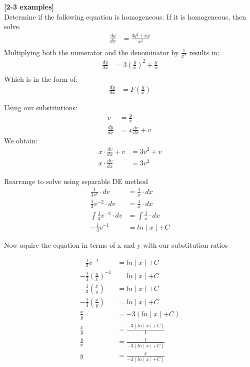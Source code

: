 \documentclass{article}
\begin{document}
\begin{flushleft}
{\textbf{[2-3 examples]}\\
Determine if the following equation is homogeneous. If it is homogeneous, then solve.
\begin{align*}
\frac{dy}{dx} & = \frac{3y^2 +xy}{x^2}\\
\end{align*}
Multiplying both the numerator and the denominator by $\frac{1}{x^2}$ results in:\\
\begin{align*}
\frac{dy}{dx} & = 3(\frac{y}{x})^2+\frac{y}{x}\\
\end{align*}
Which is in the form of:
\begin{align*}
\frac{dy}{dx} & = F (\frac{y}{x})
\end{align*}

Using our substitutions:\\
\begin{align*}
v & = \frac{y}{x}\\
\frac{dy}{dx} & = x \frac{dv}{dx} + v\
 \end{align*}
We obtain:\\
\begin{align*}
x \cdot \frac{dv}{dx} + v & = 3v^2 + v\\
x \cdot  \frac{dv}{dx}  & = 3v^2 
\end{align*}

Rearrange to solve using separable DE method\\
\begin{align*}
\frac{1}{3v^2} \cdot dv & = \frac{1}{x} \cdot dx \\
\frac{1}{3} v^{-2} \cdot dv & = \frac{1}{x} \cdot dx \\
\int \frac{1}{3} v^{-2} \cdot dv & = \int \frac{1}{x} \cdot dx  \\
-\frac{1}{3}v^{-1} & = ln\mid x \mid + C
\end{align*}

Now aquire the equation in terms of x and y with our substitution ratios

\begin{align*}
-\frac{1}{3}v^{-1} & = ln\mid x \mid + C \\
-\frac{1}{3}(\frac{y}{x})^{-1} & = ln\mid x \mid + C \\
-\frac{1}{3}(\frac{x}{y}) & = ln\mid x \mid + C \\
-\frac{1}{3}(\frac{x}{y}) & = ln\mid x \mid + C \\
\frac{x}{y} & = -3 (ln\mid x \mid + C) \\
\frac{x}{y} & = \frac{ -3 (ln\mid x \mid + C) }{1} \\
\frac{y}{x} & = \frac{1}{ -3 (ln\mid x \mid + C) } \\
y & =  \frac{x}{ -3 (ln\mid x \mid + C) } \\
\end{align*}

}
\end{flushleft}
\end{document}
